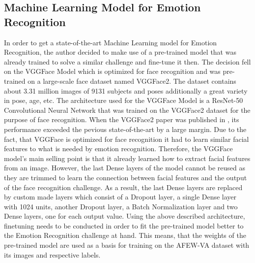 \subsection{Machine Learning Model for Emotion Recognition}
In order to get a state-of-the-art Machine Learning model for Emotion Recognition, the author decided to make use of a pre-trained model that was already trained to solve a similar challenge and fine-tune it then. 
\newline\newline
The decision fell on the VGGFace Model which is optimized for face recognition and was pre-trained on a large-scale face dataset named VGGFace2. The dataset contains about 3.31 million images of 9131 subjects and poses additionally a great variety in pose, age, etc. The architecture used for the VGGFace Model is a ResNet-50 Convolutional Neural Network that was trained on the VGGFace2 dataset for the purpose of face recognition. When the VGGFace2 paper\citet{Cao:2018:VGGFace2} was published in \citeyear{Cao:2018:VGGFace2}, its performance exceeded the pevious state-of-the-art by a large margin. \citep{Cao:2018:VGGFace2}
\newline\newline
Due to the fact, that VGGFace is optimized for face recognition it had to learn similar facial features to what is needed by emotion recognition. Therefore, the VGGFace model's main selling point is that it already learned how to extract facial features from an image. However, the last Dense layers of the model cannot be reused as they are trimmed to learn the connection between facial features and the output of the face recognition challenge. As a result, the last Dense layers are replaced by custom made layers which consist of a Dropout layer, a single Dense layer with 1024 units, another Dropout layer, a Batch Normalization layer and two Dense layers, one for each output value.
\newline\newline
Using the above described architecture, finetuning needs to be conducted in order to fit the pre-trained model better to the Emotion Recognition challenge at hand. This means, that the weights of the pre-trained model are used as a basis for training on the AFEW-VA dataset with its images and respective labels.